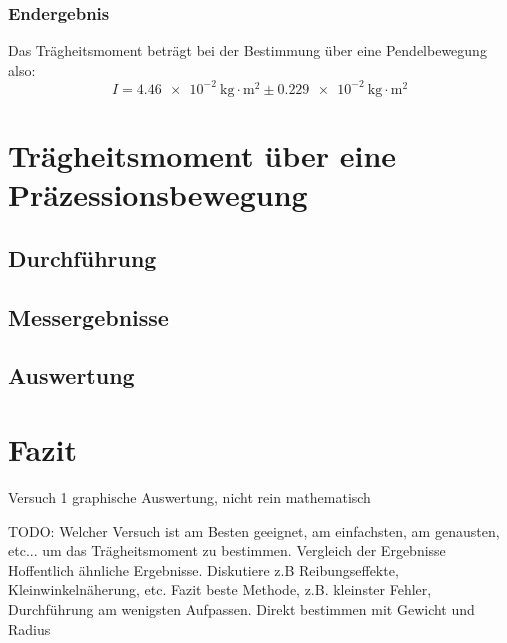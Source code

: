 \documentclass{article}
\begin{document}
			\subsubsection{Endergebnis}
				Das Trägheitsmoment beträgt bei der Bestimmung über eine Pendelbewegung also:
				\begin{equation}
					I = \SI{4,46e-2}{ \kilogram \cdot \metre^2 } \pm \SI{0,229e-2}{ \kilogram \cdot \metre^2 }
				\end{equation}


	\section{Trägheitsmoment über eine Präzessionsbewegung}
		\subsection{Durchführung}

		\subsection{Messergebnisse}
		
		\subsection{Auswertung}

	\section{Fazit}
		Versuch 1 graphische Auswertung, nicht rein mathematisch

		TODO: Welcher Versuch ist am Besten geeignet, am einfachsten, am genausten, etc... um das Trägheitsmoment zu bestimmen.
		Vergleich der Ergebnisse
		Hoffentlich ähnliche Ergebnisse.
		Diskutiere z.B Reibungseffekte, Kleinwinkelnäherung, etc.
		Fazit beste Methode, z.B. kleinster Fehler, Durchführung am wenigsten Aufpassen.
		Direkt bestimmen mit Gewicht und Radius


	\printbibliography[title={Quellen}]
\end{document}
